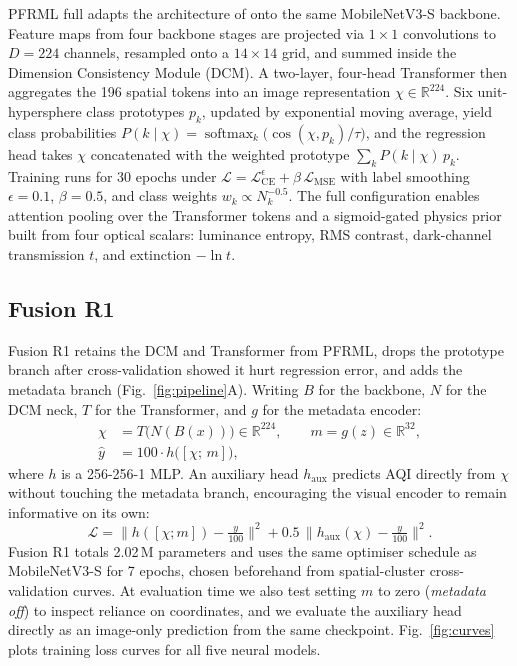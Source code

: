 \documentclass[conference]{IEEEtran}
\begin{document}
PFRML full adapts the architecture of
\cite{wangPrototypeFeatureRepresentationGuided2026} onto the same MobileNetV3-S
backbone. Feature maps from four backbone stages are projected via $1 \times 1$
convolutions to $D{=}224$ channels, resampled onto a $14 \times 14$ grid, and
summed inside the Dimension Consistency Module (DCM). A two-layer, four-head
Transformer then aggregates the 196 spatial tokens into an image representation
$\chi \in \mathbb{R}^{224}$. Six unit-hypersphere class prototypes $p_k$,
updated by exponential moving average, yield class probabilities
$P(k \mid \chi) = \operatorname{softmax}_k\bigl( \cos(\chi,p_k)/\tau \bigr)$,
and the regression head takes $\chi$ concatenated with the weighted prototype
$\sum_k P(k \mid \chi)\,p_k$. Training runs for 30 epochs under
$\mathcal{L} = \mathcal{L}_{\mathrm{CE}}^{\epsilon} + \beta\,\mathcal{L}_{\mathrm{MSE}}$
with label smoothing $\epsilon{=}0.1$, $\beta{=}0.5$, and class weights
$w_k \propto N_k^{-0.5}$. The full configuration enables attention pooling over
the Transformer tokens and a sigmoid-gated physics prior built from four optical
scalars: luminance entropy, RMS contrast, dark-channel transmission $t$, and
extinction $-\ln t$.

\subsection{Fusion R1}

Fusion R1 retains the DCM and Transformer from PFRML, drops the prototype branch
after cross-validation showed it hurt regression error, and adds the metadata
branch (Fig.~\ref{fig:pipeline}A). Writing $B$ for the backbone, $N$ for the DCM
neck, $T$ for the Transformer, and $g$ for the metadata encoder:
\begin{align}
  \chi    & = T\bigl( N(B(x)) \bigr) \in \mathbb{R}^{224}, \qquad m = g(z) \in \mathbb{R}^{32}, \\
  \hat{y} & = 100 \cdot h\bigl( [\chi;\, m] \bigr),
\end{align}
where $h$ is a 256-256-1 MLP. An auxiliary head $h_{\mathrm{aux}}$ predicts AQI
directly from $\chi$ without touching the metadata branch, encouraging the
visual encoder to remain informative on its own:
\begin{equation}
  \mathcal{L}
  = \bigl\| h([\chi;m]) - \tfrac{y}{100} \bigr\|^2
    + 0.5\,\bigl\| h_{\mathrm{aux}}(\chi) - \tfrac{y}{100} \bigr\|^2 .
\end{equation}
Fusion R1 totals 2.02\,M parameters and uses the same optimiser schedule as
MobileNetV3-S for 7 epochs, chosen beforehand from spatial-cluster
cross-validation curves. At evaluation time we also test setting $m$ to zero
(\emph{metadata off}) to inspect reliance on coordinates, and we evaluate the
auxiliary head directly as an image-only prediction from the same checkpoint.
Fig.~\ref{fig:curves} plots training loss curves for all five neural models.
\end{document}
